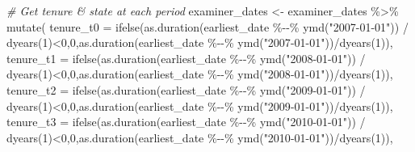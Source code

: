 \documentclass[
]{article}
\newenvironment{Shaded}{\begin{snugshade}}{\end{snugshade}}
\newcommand{\AttributeTok}[1]{\textcolor[rgb]{0.77,0.63,0.00}{#1}}
\newcommand{\CommentTok}[1]{\textcolor[rgb]{0.56,0.35,0.01}{\textit{#1}}}
\newcommand{\DecValTok}[1]{\textcolor[rgb]{0.00,0.00,0.81}{#1}}
\newcommand{\FunctionTok}[1]{\textcolor[rgb]{0.00,0.00,0.00}{#1}}
\newcommand{\NormalTok}[1]{#1}
\newcommand{\OtherTok}[1]{\textcolor[rgb]{0.56,0.35,0.01}{#1}}
\newcommand{\SpecialCharTok}[1]{\textcolor[rgb]{0.00,0.00,0.00}{#1}}
\newcommand{\StringTok}[1]{\textcolor[rgb]{0.31,0.60,0.02}{#1}}
\begin{document}
\begin{Shaded}
\begin{Highlighting}[]
\CommentTok{\# Get tenure \& state at each period}
\NormalTok{examiner\_dates }\OtherTok{\textless{}{-}}\NormalTok{ examiner\_dates }\SpecialCharTok{\%\textgreater{}\%} 
  \FunctionTok{mutate}\NormalTok{(}
    \AttributeTok{tenure\_t0 =} \FunctionTok{ifelse}\NormalTok{(}\FunctionTok{as.duration}\NormalTok{(earliest\_date }\SpecialCharTok{\%{-}{-}\%} \FunctionTok{ymd}\NormalTok{(}\StringTok{"2007{-}01{-}01"}\NormalTok{)) }\SpecialCharTok{/} \FunctionTok{dyears}\NormalTok{(}\DecValTok{1}\NormalTok{)}\SpecialCharTok{\textless{}}\DecValTok{0}\NormalTok{,}\DecValTok{0}\NormalTok{,}\FunctionTok{as.duration}\NormalTok{(earliest\_date }\SpecialCharTok{\%{-}{-}\%} \FunctionTok{ymd}\NormalTok{(}\StringTok{"2007{-}01{-}01"}\NormalTok{))}\SpecialCharTok{/}\FunctionTok{dyears}\NormalTok{(}\DecValTok{1}\NormalTok{)),}
    \AttributeTok{tenure\_t1 =} \FunctionTok{ifelse}\NormalTok{(}\FunctionTok{as.duration}\NormalTok{(earliest\_date }\SpecialCharTok{\%{-}{-}\%} \FunctionTok{ymd}\NormalTok{(}\StringTok{"2008{-}01{-}01"}\NormalTok{)) }\SpecialCharTok{/} \FunctionTok{dyears}\NormalTok{(}\DecValTok{1}\NormalTok{)}\SpecialCharTok{\textless{}}\DecValTok{0}\NormalTok{,}\DecValTok{0}\NormalTok{,}\FunctionTok{as.duration}\NormalTok{(earliest\_date }\SpecialCharTok{\%{-}{-}\%} \FunctionTok{ymd}\NormalTok{(}\StringTok{"2008{-}01{-}01"}\NormalTok{))}\SpecialCharTok{/}\FunctionTok{dyears}\NormalTok{(}\DecValTok{1}\NormalTok{)),}
    \AttributeTok{tenure\_t2 =} \FunctionTok{ifelse}\NormalTok{(}\FunctionTok{as.duration}\NormalTok{(earliest\_date }\SpecialCharTok{\%{-}{-}\%} \FunctionTok{ymd}\NormalTok{(}\StringTok{"2009{-}01{-}01"}\NormalTok{)) }\SpecialCharTok{/} \FunctionTok{dyears}\NormalTok{(}\DecValTok{1}\NormalTok{)}\SpecialCharTok{\textless{}}\DecValTok{0}\NormalTok{,}\DecValTok{0}\NormalTok{,}\FunctionTok{as.duration}\NormalTok{(earliest\_date }\SpecialCharTok{\%{-}{-}\%} \FunctionTok{ymd}\NormalTok{(}\StringTok{"2009{-}01{-}01"}\NormalTok{))}\SpecialCharTok{/}\FunctionTok{dyears}\NormalTok{(}\DecValTok{1}\NormalTok{)),}
    \AttributeTok{tenure\_t3 =} \FunctionTok{ifelse}\NormalTok{(}\FunctionTok{as.duration}\NormalTok{(earliest\_date }\SpecialCharTok{\%{-}{-}\%} \FunctionTok{ymd}\NormalTok{(}\StringTok{"2010{-}01{-}01"}\NormalTok{)) }\SpecialCharTok{/} \FunctionTok{dyears}\NormalTok{(}\DecValTok{1}\NormalTok{)}\SpecialCharTok{\textless{}}\DecValTok{0}\NormalTok{,}\DecValTok{0}\NormalTok{,}\FunctionTok{as.duration}\NormalTok{(earliest\_date }\SpecialCharTok{\%{-}{-}\%} \FunctionTok{ymd}\NormalTok{(}\StringTok{"2010{-}01{-}01"}\NormalTok{))}\SpecialCharTok{/}\FunctionTok{dyears}\NormalTok{(}\DecValTok{1}\NormalTok{)),}

\end{Highlighting}
\end{Shaded}
\end{document}
